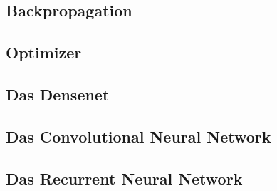 \documentclass[conference, german]{IEEEtran}
\begin{document}
\subsection{Backpropagation}
\subsection{Optimizer}
\subsection{Das Densenet}
\subsection{Das Convolutional Neural Network}
\subsection{Das Recurrent Neural Network}

\printbibliography
\end{document}
